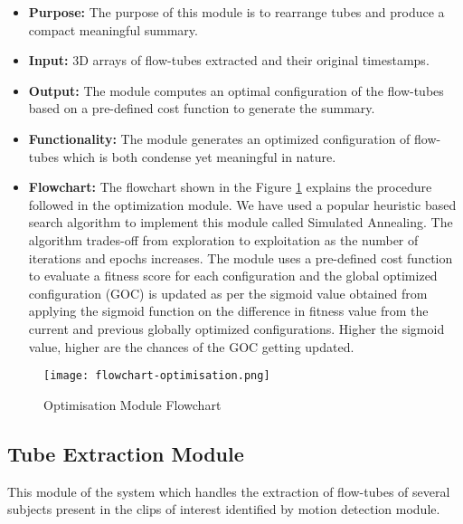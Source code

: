     \begin{itemize}
        \item \textbf{Purpose:} The purpose of this module is to rearrange tubes and produce a compact meaningful summary.
        \item \textbf{Input:} 3D arrays of flow-tubes extracted and their original timestamps.
        \item \textbf{Output:} The module computes an optimal configuration of the flow-tubes based on a pre-defined cost function to generate the summary.
        \item \textbf{Functionality:} The module generates an optimized configuration of flow-tubes which is both condense yet meaningful in nature.
        \item \textbf{Flowchart:} The flowchart shown in the Figure \ref{img:flowchart-optimisation} explains the procedure followed in the optimization module. We have used a popular heuristic based search algorithm to implement this module called Simulated Annealing. The algorithm trades-off from exploration to exploitation as the number of iterations and epochs increases.  The module uses a pre-defined cost function to evaluate a fitness score for each configuration and the global optimized configuration (GOC) is updated as per the sigmoid value obtained from applying the sigmoid function on the difference in fitness value from the current and previous globally optimized configurations. Higher the sigmoid value, higher are the chances of the GOC getting updated.
    \end{itemize}


    \begin{figure}[H]
        \centering
        \texttt{[image: flowchart-optimisation.png]}
        \caption{Optimisation Module Flowchart}
        \label{img:flowchart-optimisation}
    \end{figure}


    \subsection{Tube Extraction Module}
    This module of the system which handles the extraction of flow-tubes of several subjects present in the clips of interest identified by motion detection module.

